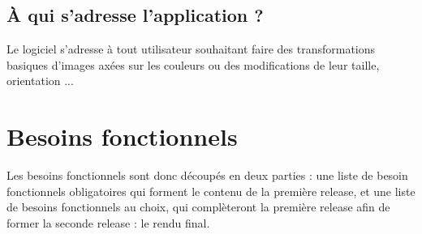 \documentclass{article}
\begin{document}
\subsection{À qui s'adresse l'application ?}

Le logiciel s'adresse à tout utilisateur souhaitant faire des
transformations basiques d'images axées sur les couleurs ou des
modifications de leur taille, orientation ...


\section{Besoins fonctionnels}

Les besoins fonctionnels sont donc découpés en deux parties : une
liste de besoin fonctionnels obligatoires qui forment le contenu de la
première release, et une liste de besoins fonctionnels au choix, qui
complèteront la première release afin de former la seconde release : le rendu final.
\end{document}
